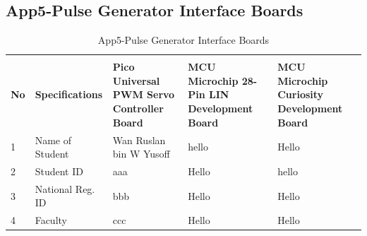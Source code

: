 \begin{landscape}
\subsection{App5-Pulse Generator Interface Boards}
	
	\begin{table}[ht]
		\begin{center}
			\caption{App5-Pulse Generator Interface Boards}		
			\label{table:App5-Pulse Generator Interface Boards}	
			
			\begin{tabular}{ |p{0.5cm}|p{5.0cm}|p{6.0cm}|p{6.0cm}|p{6.0cm}|}
				\rowcolor{gray!10}			
				\hline \multicolumn{5}{|c|}{\textbf{Pulse Generator Interface Boards}} \\ [1.0ex]
				\rowcolor{gray!10}
				\hline \textbf{No} & \textbf{Specifications}    & \textbf{Pico Universal PWM Servo Controller Board} & \textbf{MCU Microchip 28-Pin LIN Development Board} & \textbf{MCU Microchip Curiosity Development Board}\\ 
				
				\hline 1 & Name of Student    & Wan Ruslan bin W Yusoff & hello & Hello\\ 
				\hline 2 & Student ID         &  aaa & Hello & hello\\ 
				\hline 3 & National Reg. ID   & bbb  & Hello & Hello \\ 
				\hline 4 & Faculty            & ccc  & Hello & Hello\\ 
				
				\hline
			\end{tabular}
		\end{center}
	\end{table}  
	
	
\end{landscape}
\clearpage
